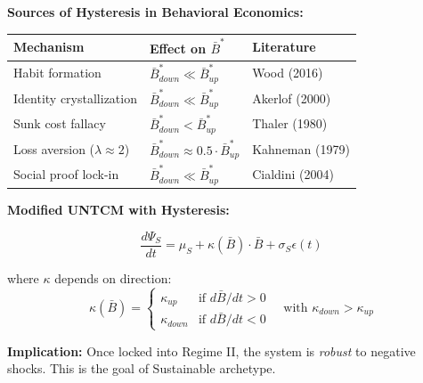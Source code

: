\begin{tcolorbox}[colback=green!5!white, colframe=green!75!black,
    title=\textbf{Extension UNTCM-X2: Hysteresis and Asymmetric Tipping}]
\textbf{Sources of Hysteresis in Behavioral Economics:}

\begin{center}
\renewcommand{\arraystretch}{1.2}
\begin{tabular}{@{}lll@{}}
\toprule
\textbf{Mechanism} & \textbf{Effect on $\bar{B}^*$} & \textbf{Literature} \\
\midrule
Habit formation & $\bar{B}^*_{down} \ll \bar{B}^*_{up}$ & Wood (2016) \\
Identity crystallization & $\bar{B}^*_{down} \ll \bar{B}^*_{up}$ & Akerlof (2000) \\
Sunk cost fallacy & $\bar{B}^*_{down} < \bar{B}^*_{up}$ & Thaler (1980) \\
Loss aversion ($\lambda \approx 2$) & $\bar{B}^*_{down} \approx 0.5 \cdot \bar{B}^*_{up}$ & Kahneman (1979) \\
Social proof lock-in & $\bar{B}^*_{down} \ll \bar{B}^*_{up}$ & Cialdini (2004) \\
\bottomrule
\end{tabular}
\end{center}

\textbf{Modified UNTCM with Hysteresis:}

\begin{equation}
\frac{d\Psi_S}{dt} = \mu_S + \kappa(\bar{B}) \cdot \bar{B} + \sigma_S \epsilon(t)
\end{equation}

where $\kappa$ depends on direction:
\begin{equation}
\kappa(\bar{B}) = \begin{cases}
\kappa_{up} & \text{if } d\bar{B}/dt > 0 \\
\kappa_{down} & \text{if } d\bar{B}/dt < 0
\end{cases}
\quad \text{with } \kappa_{down} > \kappa_{up}
\end{equation}

\textbf{Implication:} Once locked into Regime II, the system is \emph{robust} to negative shocks. This is the goal of Sustainable archetype.

\end{tcolorbox}

